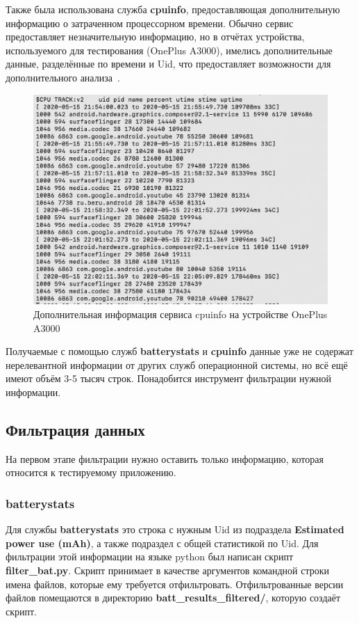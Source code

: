 \documentclass[a4paper,14pt]{extarticle} %
\begin{document}
	Также была использована служба \textbf{cpuinfo}, предоставляющая дополнительную информацию о затраченном процессорном времени. Обычно сервис предоставляет незначительную информацию, но в отчётах устройства, используемого для тестирования (OnePlus A3000), имелись дополнительные данные, разделённые по времени и Uid, что предоставляет возможности для дополнительного анализа~\ris{\ref{fig:cpuinfo}}.
	
	\begin{figure}[H]
		\includegraphics[width=\textwidth]{cpuinfo}
		\caption{Дополнительная информация сервиса cpuinfo на устройстве OnePlus A3000}
		\label{fig:cpuinfo}
	\end{figure}

	Получаемые с помощью служб \textbf{batterystats} и \textbf{cpuinfo} данные уже не содержат нерелевантной информации от других служб операционной системы, но всё ещё имеют объём 3-5 тысяч строк. Понадобится инструмент фильтрации нужной информации.

	\subsection{Фильтрация данных}
	
	На первом этапе фильтрации нужно оставить только информацию, которая относится к тестируемому приложению. 
	
	\subsubsection{batterystats}
	
	Для службы \textbf{batterystats} это строка с нужным Uid из подраздела \textbf{Estimated power use (mAh)}, а также подраздел с общей статистикой по Uid. Для фильтрации этой информации на языке python был написан скрипт \textbf{filter\_bat.py}. Скрипт принимает в качестве аргументов командной строки имена файлов, которые ему требуется отфильтровать. Отфильтрованные версии файлов помещаются в директорию \textbf{batt\_results\_filtered/}, которую создаёт скрипт.
	
\end{document}

